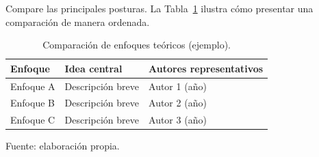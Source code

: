 Compare las principales posturas. La Tabla~\ref{tab:enfoques} ilustra cómo
presentar una comparación de manera ordenada.

\begin{table}[htbp]
  \centering
  \caption{Comparación de enfoques teóricos (ejemplo).}
  \label{tab:enfoques}
  \begin{tabular}{lll}
    \toprule
    Enfoque & Idea central & Autores representativos \\
    \midrule
    Enfoque A & Descripción breve & Autor 1 (año) \\
    Enfoque B & Descripción breve & Autor 2 (año) \\
    Enfoque C & Descripción breve & Autor 3 (año) \\
    \bottomrule
  \end{tabular}
  \par\smallskip\footnotesize Fuente: elaboración propia.
\end{table}
